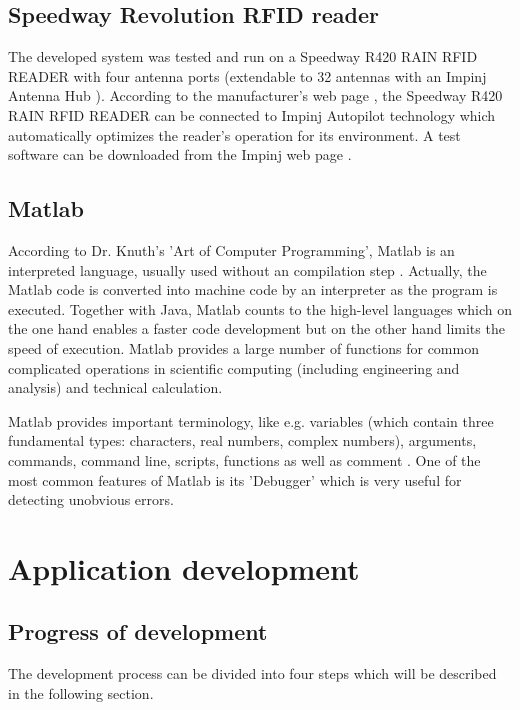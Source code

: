 \subsection{Speedway Revolution RFID reader}

The developed system was tested and run on a Speedway R420 RAIN RFID READER \cite{speedway} with four antenna ports (extendable to 32 antennas with an Impinj Antenna Hub \cite{speedway}). According to the manufacturer's web page \cite{speedway}, the Speedway R420 RAIN RFID READER can be connected to Impinj Autopilot technology which automatically optimizes the reader's operation for its environment. A test software can be downloaded from the Impinj web page  \cite{speedway}.

\subsection{Matlab}

According to Dr. Knuth's 'Art of Computer Programming', Matlab is an interpreted language, usually used without an compilation step \cite[lesson 1]{introduction_matlab}. Actually, the Matlab code is converted into machine code by an interpreter as the program is executed. Together with Java, Matlab counts to the high-level languages which on the one hand enables a faster code development but on the other hand limits the speed of execution. Matlab provides a large number of functions for common complicated operations in scientific computing (including engineering and analysis) and technical calculation.

Matlab provides important terminology, like e.g. variables (which contain three fundamental types: characters, real numbers, complex numbers), arguments, commands, command line, scripts, functions as well as comment \cite[lesson 1]{introduction_matlab}. 
One of the most common features of Matlab is its 'Debugger' \cite[lesson 8]{introduction_matlab} which is very useful for detecting unobvious errors.

\section{Application development} \label{app_development}

\subsection{Progress of development}

The development process can be divided into four steps which will be described in the following section. 

